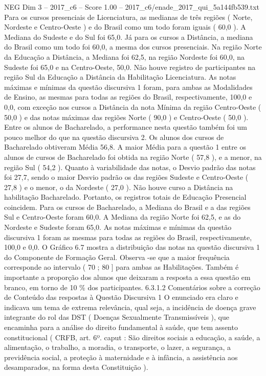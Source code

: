 \begin{textsample}{NEG Dim 3 – 2017\_c6 – Score 1.00 – 2017\_c6/enade\_2017\_qui\_5a144fb539.txt}
Para os cursos presenciais de Licenciatura, as medianas de três regiões ( Norte, Nordeste e Centro-Oeste ) e do Brasil como um todo foram iguais ( 60,0 ).
A Mediana do Sudeste e do Sul foi 65,0.
Já para os cursos a Distância, a mediana do Brasil como um todo foi 60,0, a mesma dos cursos presenciais.
Na região Norte da Educação a Distância, a Mediana foi 62,5, na região Nordeste foi 60,0, na Sudeste foi 65,0 e na Centro-Oeste, 50,0.
Não houve registro de participantes na região Sul da Educação a Distância da Habilitação Licenciatura.
As notas máximas e mínimas da questão discursiva 1 foram, para ambas as Modalidades de Ensino, as mesmas para todas as regiões do Brasil, respectivamente, 100,0 e 0,0, com exceção nos cursos a Distância da nota Mínima da região Centro-Oeste ( 50,0 ) e das notas máximas das regiões Norte ( 90,0 ) e Centro-Oeste ( 50,0 ).
Entre os alunos de Bacharelado, a performance nesta questão também foi um pouco melhor do que na questão discursiva 2.
Os alunos dos cursos de Bacharelado obtiveram Média 56,8.
A maior Média para a questão 1 entre os alunos de cursos de Bacharelado foi obtida na região Norte ( 57,8 ), e a menor, na região Sul ( 54,2 ).
Quanto à variabilidade das notas, o Desvio padrão das notas foi 27,7, sendo o maior Desvio padrão os das regiões Sudeste e Centro-Oeste ( 27,8 ) e o menor, o da Nordeste ( 27,0 ).
Não houve curso a Distância na habilitação Bacharelado.
Portanto, os registros totais de Educação Presencial coincidem.
Para os cursos de Bacharelado, a Mediana do Brasil e a das regiões Sul e Centro-Oeste foram 60,0.
A Mediana da região Norte foi 62,5, e as do Nordeste e Sudeste foram 65,0.
As notas máximas e mínimas da questão discursiva 1 foram as mesmas para todas as regiões do Brasil, respectivamente, 100,0 e 0,0.
O Gráfico 6.7 mostra a distribuição das notas na questão discursiva 1 do Componente de Formação Geral.
Observa -se que a maior frequência corresponde ao intervalo ( 70 ; 80 ] para ambas as Habilitações.
Também é importante a proporção dos alunos que deixaram a resposta a essa questão em branco, em torno de 10 \% dos participantes. 6.3.1.2 Comentários sobre a correção de Conteúdo das respostas à Questão Discursiva 1 O enunciado era claro e indicava um tema de extrema relevância, qual seja, a incidência de doença grave integrante do rol das DST ( Doenças Sexualmente Transmissíveis ), que encaminha para a análise do direito fundamental à saúde, que tem assento constitucional ( CRFB, art. 6º. caput : São direitos sociais a educação, a saúde, a alimentação, o trabalho, a moradia, o transporte, o lazer, a segurança, a previdência social, a proteção à maternidade e à infância, a assistência aos desamparados, na forma desta Constituição ).

\end{textsample}

